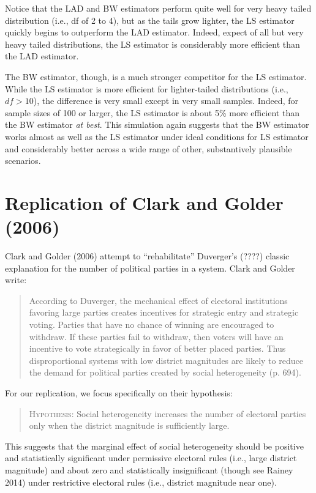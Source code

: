 \documentclass[12pt]{article}
\begin{document}
Notice that the LAD and BW estimators perform quite well for very heavy tailed distribution (i.e., df of 2 to 4), but as the tails grow lighter, the LS estimator quickly begins to outperform the LAD estimator. Indeed, expect of all but very heavy tailed distributions, the LS estimator is considerably more efficient than the LAD estimator. 

The BW estimator, though, is a much stronger competitor for the LS estimator. While the LS estimator is more efficient for lighter-tailed distributions (i.e., $df > 10$), the difference is very small except in very small samples. Indeed, for sample sizes of 100 or larger, the LS estimator is about 5\% more efficient than the BW estimator \textit{at best}. This simulation again suggests that the BW estimator works almost as well as the LS estimator under ideal conditions for LS estimator and considerably better across a wide range of other, substantively plausible scenarios.

\section*{Replication of Clark and Golder (2006)}

Clark and Golder (2006) attempt to ``rehabilitate'' Duverger's (????) classic explanation for the number of political parties in a system. Clark and Golder write: 

\begin{quote}
According to Duverger, the mechanical effect of electoral institutions favoring large parties creates incentives for strategic entry and strategic voting. Parties that have no chance of winning are encouraged to withdraw. If these parties fail to withdraw, then voters will have an incentive to vote strategically in favor of better placed parties. Thus disproportional systems with low district magnitudes are likely to reduce the demand for political parties created by social heterogeneity (p. 694).
\end{quote}

For our replication, we focus specifically on their hypothesis:
\begin{quote}
\textsc{Hypothesis:} Social heterogeneity increases the number of electoral parties only when the district magnitude is sufficiently large.
\end{quote}

This suggests that the marginal effect of social heterogeneity should be positive and statistically significant under permissive electoral rules (i.e., large district magnitude) and about zero and statistically insignificant (though see Rainey 2014) under restrictive electoral rules (i.e., district magnitude near one).
\end{document}
